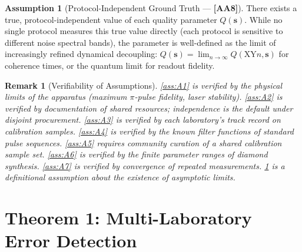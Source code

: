 \documentclass[11pt,a4paper]{article}
\newtheorem{remark}[theorem]{Remark}
\theoremstyle{definition}
\newtheorem{assumption}[theorem]{Assumption}
\newcommand{\assumptionTag}[1]{\textsf{\textbf{[A#1]}}}
\begin{document}
\begin{assumption}[Protocol-Independent Ground Truth — \assumptionTag{A8}]
\label{ass:A8}
There exists a true, protocol-independent value of each quality
parameter $Q(\mathbf{s})$. While no single protocol measures this
true value directly (each protocol is sensitive to different noise
spectral bands), the parameter is well-defined as the limit of
increasingly refined dynamical decoupling: $Q(\mathbf{s}) = \lim_{n \to \infty} Q(\text{XY}n, \mathbf{s})$
for coherence times, or the quantum limit for readout fidelity.
\end{assumption}

\begin{remark}[Verifiability of Assumptions]
\ref{ass:A1} is verified by the physical limits of the apparatus
(maximum $\pi$-pulse fidelity, laser stability). \ref{ass:A2} is
verified by documentation of shared resources; independence is the
default under disjoint procurement. \ref{ass:A3} is verified by
each laboratory's track record on calibration samples. \ref{ass:A4}
is verified by the known filter functions of standard pulse sequences.
\ref{ass:A5} requires community curation of a shared calibration
sample set. \ref{ass:A6} is verified by the finite parameter ranges
of diamond synthesis. \ref{ass:A7} is verified by convergence of
repeated measurements. \ref{ass:A8} is a definitional assumption
about the existence of asymptotic limits.
\end{remark}

\section{Theorem 1: Multi-Laboratory Error Detection }
\label{sec:thm1}
\end{document}

